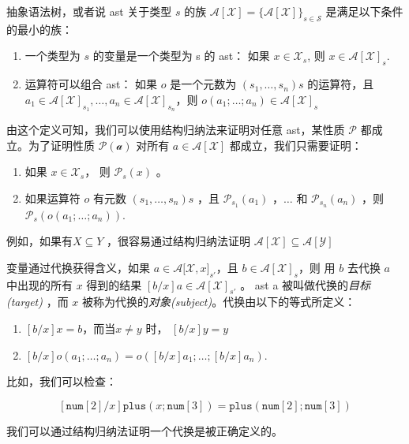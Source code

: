 抽象语法树，或者说 ast 关于类型 \(s\) 的族
\(\mathcal{A}[\mathcal{X}]=\{\mathcal{A}[\mathcal{X}]\}_{s\in\mathcal{S}}\)
是满足以下条件的最小的族：

\begin{enumerate}
\def\labelenumi{\arabic{enumi}.}
\item
  一个类型为 \(s\) 的变量是一个类型为 s 的 ast： 如果
  \(x\in \mathcal{X}_s\), 则 \(x \in \mathcal{A[X]}_s\).
\item
  运算符可以组合 ast： 如果 \(o\) 是一个元数为 \((s_1,\dots, s_n)s\)
  的运算符，且
  \(a_1\in \mathcal{A[X]}_{s_1},\dots,a_n\in\mathcal{A[X]}_{s_n}\)，则
  \(o(a_1;\dots ;a_n)\in\mathcal{A[X]}_s\)
\end{enumerate}

由这个定义可知，我们可以使用结构归纳法来证明对任意 ast，某性质
\(\mathcal{P}\) 都成立。为了证明性质 \(\mathcal{P(a)}\) 对所有
\(a\in\mathcal{A[X]}\) 都成立，我们只需要证明：

\begin{enumerate}
\def\labelenumi{\arabic{enumi}.}
\item
  如果 \(x\in\mathcal{X}_s\)， 则 \(\mathcal{P}_s(x)\) 。
\item
  如果运算符 \(o\) 有元数 \((s_1,\dots, s_n)s\) ，且
  \(\mathcal{P}_{s_1}(a_1)\) ，\(\dots\) 和 \(\mathcal{P}_{s_n}(a_n)\)
  ，则 \(\mathcal{P}_s(o(a_1;\dots ;a_n))\).
\end{enumerate}

例如，如果有\(X\subseteq Y\) ，很容易通过结构归纳法证明
\(\mathcal{A[X]\subseteq A[Y]}\)

变量通过代换获得含义，如果 \(a\in\mathcal{A[X,}x]_{s'}\)，且
\(b\in \mathcal{A[X]}_s\)，则 用 \(b\) 去代换 \(a\) 中出现的所有 \(x\)
得到的结果 \([b/x]a\in \mathcal{A[X]}_{s'}\) 。 ast a
被叫做代换的\emph{目标(target)} ，而 \(x\)
被称为代换的\emph{对象(subject)}。代换由以下的等式所定义：

\begin{enumerate}
\def\labelenumi{\arabic{enumi}.}
\item
  \([b/x]x=b\)，而当\(x\neq y\) 时， \([b/x]y=y\) 
\item
  \([b/x]o(a_1;\dots;a_n)=o([b/x]a_1;\dots ;[b/x]a_n)\).
\end{enumerate}

比如，我们可以检查：

\[[\texttt{num}[2]/x]\texttt{plus}(x;\texttt{num}[3])=\texttt{plus}(\texttt{num}[2];\texttt{num}[3])\]

我们可以通过结构归纳法证明一个代换是被正确定义的。

